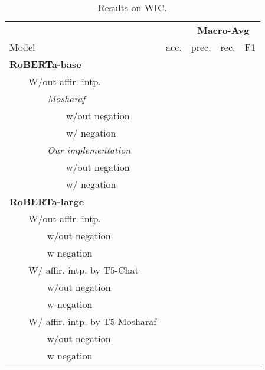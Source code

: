 \begin{table*}
\centering
\begin{tabular}{lrrrr}
\toprule
&& \multicolumn{3}{c}{\textbf{Macro-Avg}} \\
Model & acc. & prec. & rec. & F1 \\
\midrule
\textbf{RoBERTa-base} \\
~~~~W/out affir. intp. \\
~~~~~~~~\textit{Mosharaf} \\
~~~~~~~~~~~~w/out negation \\ 
~~~~~~~~~~~~w/ negation \\ 
\midrule
~~~~~~~~\textit{Our implementation} \\
~~~~~~~~~~~~w/out negation \\
~~~~~~~~~~~~w/ negation \\ 
\bottomrule
\textbf{RoBERTa-large} \\
~~~~W/out affir. intp. \\
~~~~~~~~w/out negation \\ 
~~~~~~~~w negation \\ 
\midrule
~~~~W/ affir. intp. by T5-Chat \\
~~~~~~~~w/out negation \\ 
~~~~~~~~w negation \\ 
\midrule
~~~~W/ affir. intp. by T5-Mosharaf \\
~~~~~~~~w/out negation \\ 
~~~~~~~~w negation \\ 
\bottomrule
\end{tabular}
\caption{Results on WIC.}
\end{table*}